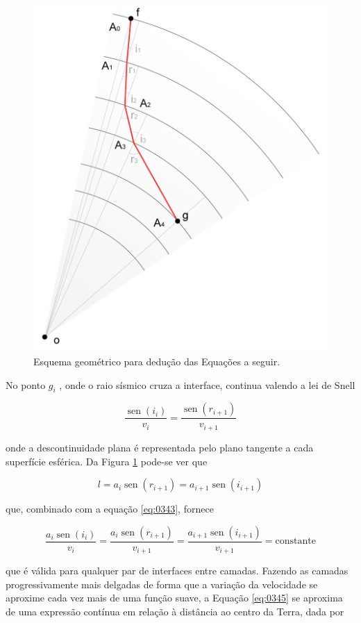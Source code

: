 \documentclass[]{book}
\theoremstyle{definition}
\theoremstyle{definition}
\theoremstyle{definition}
\theoremstyle{remark}
\begin{document}
\begin{figure}

{\centering \includegraphics[width=0.5\linewidth]{fig/figU15} 

}

\caption{Esquema geométrico para dedução das Equações a seguir.}\label{fig:usp0415}
\end{figure}

No ponto \(g_i\) , onde o raio sísmico cruza a interface, continua valendo a lei de Snell

\begin{equation}
\frac{\operatorname{sen}\left(i_{i}\right)}{v_{i}}=\frac{\operatorname{sen}\left(r_{i+1}\right)}{v_{i+1}}  \label{eq:0343}
\end{equation}

onde a descontinuidade plana é representada pelo plano tangente a cada superfície esférica. Da Figura \ref{fig:usp0415} pode-se ver que

\begin{equation}
l=a_{i} \operatorname{sen}\left(r_{i+1}\right)=a_{i+1} \operatorname{sen}\left(i_{i+1}\right) \label{eq:0344}
\end{equation}

que, combinado com a equação \eqref{eq:0343}, fornece

\begin{equation}
\frac{a_{i} \operatorname{sen}\left(i_{i}\right)}{v_{i}}=\frac{a_{i} \operatorname{sen}\left(r_{i+1}\right)}{v_{i+1}}=\frac{a_{i+1} \operatorname{sen}\left(i_{i+1}\right)}{v_{i+1}}= \mathrm{constante} \label{eq:0345}
\end{equation}

que é válida para qualquer par de interfaces entre camadas. Fazendo as camadas progressivamente mais delgadas de forma que a variação da velocidade se aproxime cada vez mais de uma função suave, a Equação \eqref{eq:0345} se aproxima de uma expressão contínua em relação à distância ao centro da Terra, dada por
\end{document}
